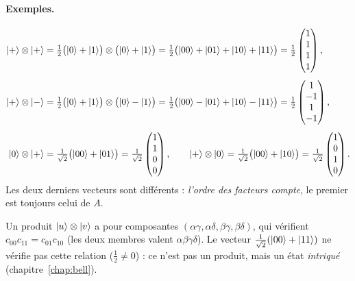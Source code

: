 \paragraph{Exemples.}
\begin{align*}
  |+\rangle\otimes|+\rangle&=\tfrac12\big(|0\rangle+|1\rangle\big)\otimes\big(|0\rangle+|1\rangle\big)
    =\tfrac12\big(|00\rangle+|01\rangle+|10\rangle+|11\rangle\big)
    =\tfrac12\begin{pmatrix}1\\ 1\\ 1\\ 1\end{pmatrix},\\[1ex]
  |+\rangle\otimes|-\rangle&=\tfrac12\big(|0\rangle+|1\rangle\big)\otimes\big(|0\rangle-|1\rangle\big)
    =\tfrac12\big(|00\rangle-|01\rangle+|10\rangle-|11\rangle\big)
    =\tfrac12\begin{pmatrix}1\\ -1\\ 1\\ -1\end{pmatrix},\\[1ex]
  |0\rangle\otimes|+\rangle&=\tfrac{1}{\sqrt2}\big(|00\rangle+|01\rangle\big)
    =\tfrac{1}{\sqrt2}\begin{pmatrix}1\\ 1\\ 0\\ 0\end{pmatrix},\qquad
  |+\rangle\otimes|0\rangle=\tfrac{1}{\sqrt2}\big(|00\rangle+|10\rangle\big)
    =\tfrac{1}{\sqrt2}\begin{pmatrix}1\\ 0\\ 1\\ 0\end{pmatrix}.
\end{align*}
Les deux derniers vecteurs sont différents : \emph{l'ordre des facteurs compte}, le premier
est toujours celui de $A$.

\begin{remarque}
Un produit $|u\rangle\otimes|v\rangle$ a pour composantes $(\alpha\gamma,\alpha\delta,\beta\gamma,\beta\delta)$,
qui vérifient $c_{00}c_{11}=c_{01}c_{10}$ (les deux membres valent $\alpha\beta\gamma\delta$). Le vecteur
$\frac{1}{\sqrt2}(|00\rangle+|11\rangle)$ ne vérifie pas cette relation ($\frac12\neq0$) : ce n'est pas un
produit, mais un état \emph{intriqué} (chapitre~\ref{chap:bell}).
\end{remarque}

